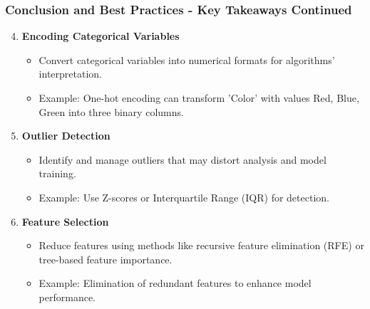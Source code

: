 \documentclass[aspectratio=169]{beamer}
\begin{document}
\begin{frame}[fragile]
  \frametitle{Conclusion and Best Practices - Key Takeaways Continued}

  \begin{enumerate}\setcounter{enumi}{3}
    \item \textbf{Encoding Categorical Variables}
      \begin{itemize}
        \item Convert categorical variables into numerical formats for algorithms’ interpretation.
        \item Example: One-hot encoding can transform 'Color' with values {Red, Blue, Green} into three binary columns.
      \end{itemize}
    
    \item \textbf{Outlier Detection}
      \begin{itemize}
        \item Identify and manage outliers that may distort analysis and model training.
        \item Example: Use Z-scores or Interquartile Range (IQR) for detection.
      \end{itemize}
    
    \item \textbf{Feature Selection}
      \begin{itemize}
        \item Reduce features using methods like recursive feature elimination (RFE) or tree-based feature importance.
        \item Example: Elimination of redundant features to enhance model performance.
      \end{itemize}
  \end{enumerate}
\end{frame}
\end{document}
